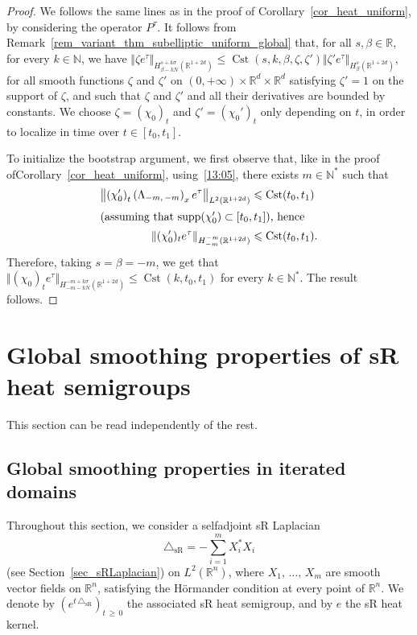 \documentclass[10pt]{amsart}
\theoremstyle{definition}\newtheorem{defi}[theo]{Definition}\newtheorem{rema}[theo]{Remark}\newtheorem{exam}[theo]{Example}\newtheorem{exem}[theo]{Example}\newtheorem{nota}[theo]{Notation}
\newcommand*\R{\mathbb{R}}
\newcommand*\N{\mathbb{N}}
\DeclareMathOperator{\supp}{supp}
\DeclareMathOperator{\Cst}{Cst}
\newcommand{\trianglesR}{\triangle_{\mathrm{sR}}}
\renewcommand{\geq}{\geqslant}
\renewcommand{\leq}{\leqslant}
\begin{document}
\begin{proof}
We follows the same lines as in the proof of Corollary~\ref{cor_heat_uniform}, by considering the operator $P^\tau$. It follows from Remark~\ref{rem_variant_thm_subelliptic_uniform_global} that, for all $s,\beta\in\R$, for every $k\in\N$, we have $\Vert \zeta e^\tau\Vert_{H^{s+k\sigma}_{\beta-kN}(\R^{1+2d})} \leq \Cst(s,k,\beta,\zeta,\zeta') \Vert \zeta' e^\tau\Vert_{H^{s}_\beta(\R^{1+2d})}$, for all smooth functions $\zeta$ and $\zeta'$ on $(0,+\infty)\times\R^d\times\R^d$ satisfying $\zeta'=1$ on the support of $\zeta$, and such that $\zeta$ and $\zeta'$ and all their derivatives are bounded by constants. We choose $\zeta=(\chi_0)_t$ and $\zeta'=(\chi_0')_t$ only depending on $t$, in order to localize in time over $t\in[t_0,t_1]$.

To initialize the bootstrap argument, we first observe that, like in the proof of\linebreak Corollary~\ref{cor_heat_uniform}, using~\eqref{13:05}, there exists $m\in\N^*$ such that
\begin{align*}
\left\Vert \left(\chi_0'\right)_t \left(\Lambda_{-m,\,-m}\right)_x e^\tau\right\Vert_{L^2\left(\R^{1+2d}\right)}&\leq\Cst(t_0,t_1)
\\
\intertext{(assuming that $\supp(\chi_0')\subset[t_0,t_1]$), hence}
\left\Vert (\chi_0')_t e^\tau\right\Vert_{H^{-m}_{-m}\left(\R^{1+2d}\right)}&\leq\Cst(t_0,t_1).
\end{align*}
Therefore, taking $s=\beta=-m$, we get that $\Vert (\chi_0)_t e^\tau\Vert_{H^{-m+k\sigma}_{-m-kN}(\R^{1+2d})}\leq \Cst(k,t_0,t_1)$ for every $k\in\N^*$. The result follows.
\end{proof}

\vspace{5em}
\goodbreak

\section{Global smoothing properties of sR heat semigroups}\label{sec:global_sR}
This section can be read independently of the rest.

\subsection{Global smoothing properties in iterated domains}\label{sec:global_estimates_sR}
Throughout this section, we consider a selfadjoint sR Laplacian
\[
\trianglesR=-\sum_{i=1}^mX_i^*X_i
\]
(see Section~\ref{sec_sRLaplacian}) on $L^2(\R^n)$, where $X_1,\,\ldots,\,X_m$ are smooth vector fields on $\R^n$, satisfying the H\"ormander condition at every point of $\R^n$. We denote by $(e^{t\,\trianglesR})_{t\,\geq\,0}$ the associated sR heat semigroup, and by $e$ the sR heat kernel.
\end{document}

